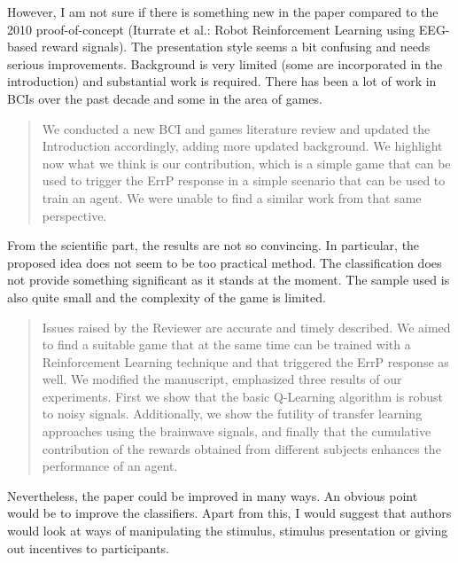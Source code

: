 \documentclass[journal,onecolumn,12pt]{IEEEtran}
\begin{document}
However, I am not sure if there is something new in the paper compared to the 2010 proof-of-concept (Iturrate et al.: Robot Reinforcement Learning using EEG-based reward signals). The presentation style seems a bit confusing and needs serious improvements. Background is very limited (some are incorporated in the introduction) and substantial work is required. There has been a lot of work in BCIs over the past decade and some in the area of games.

\begin{quotation}
{\color{blue}
We conducted a new BCI and games literature review and updated the Introduction accordingly, adding more updated background.  We highlight now what we think is our contribution, which is a simple game that can be used to trigger the ErrP response in a simple scenario that can be used to train an agent.  We were unable to find a similar work from that same perspective.  
}
\end{quotation}


From the scientific part, the results are not so convincing. In particular, the proposed idea does not seem to be too practical method. The classification does not provide something significant as it stands at the moment. The sample used is also quite small and the complexity of the game is limited.

\begin{quotation}
{\color{blue}
Issues raised by the Reviewer are accurate and timely described.  We aimed to find a suitable game that at the same time can be trained with a Reinforcement Learning technique and that triggered the ErrP response as well.  We modified the manuscript, emphasized three results of our experiments.  First we show that the basic Q-Learning algorithm is robust to noisy signals.  Additionally,  we show the futility of transfer learning approaches using the brainwave signals, and finally that the cumulative contribution of the rewards obtained from different subjects enhances the performance of an agent.
}
\end{quotation}


Nevertheless, the paper could be improved in many ways. An obvious point would be to improve the classifiers. Apart from this, I would suggest that authors would look at ways of manipulating the stimulus, stimulus presentation or giving out incentives to participants.
\end{document}

